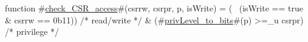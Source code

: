 function #\hyperref[sailRISCVzcheckzyCSRzyaccess]{check\_CSR\_access}#(csrrw, csrpr, p, isWrite) =
    (~ (isWrite == true & csrrw == 0b11))  /* read/write */
  & (#\hyperref[sailRISCVzprivLevelzytozybits]{privLevel\_to\_bits}#(p) >=_u csrpr)      /* privilege */
